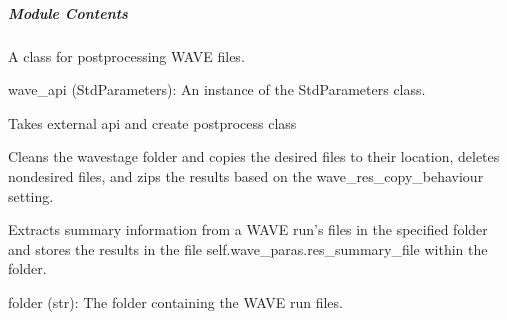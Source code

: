 \documentclass[letterpaper,10pt,english]{sphinxmanual}
\begin{document}
\subparagraph{Module Contents}
\label{\detokenize{autoapi/unduwave/wave_modules/wave_postprocess/index:module-contents}}

\begin{fulllineitems}
\label{\detokenize{autoapi/unduwave/wave_modules/wave_postprocess/index:unduwave.wave_modules.wave_postprocess.wave_postprocess}}
\pysigstartsignatures
{}
\pysigstopsignatures
\sphinxAtStartPar
A class for postprocessing WAVE files.
\begin{description}
\sphinxAtStartPar
wave\_api (StdParameters): An instance of the StdParameters class.

\end{description}

\sphinxAtStartPar
Takes external api and create postprocess class

\begin{fulllineitems}
\label{\detokenize{autoapi/unduwave/wave_modules/wave_postprocess/index:unduwave.wave_modules.wave_postprocess.wave_postprocess.copy_results}}
\pysigstartsignatures
{}
\pysigstopsignatures
\sphinxAtStartPar
Cleans the wave\sphinxhyphen{}stage folder and copies the desired files to their location,
deletes non\sphinxhyphen{}desired files, and zips the results based on the wave\_res\_copy\_behaviour setting.

\end{fulllineitems}


\begin{fulllineitems}
\label{\detokenize{autoapi/unduwave/wave_modules/wave_postprocess/index:unduwave.wave_modules.wave_postprocess.wave_postprocess.extract_summary}}
\pysigstartsignatures
{}
\pysigstopsignatures
\sphinxAtStartPar
Extracts summary information from a WAVE run’s files in the specified folder
and stores the results in the file self.wave\_paras.res\_summary\_file within the folder.
\begin{description}
\sphinxAtStartPar
folder (str): The folder containing the WAVE run files.


\end{description}
\end{fulllineitems}
\end{fulllineitems}
\end{document}
